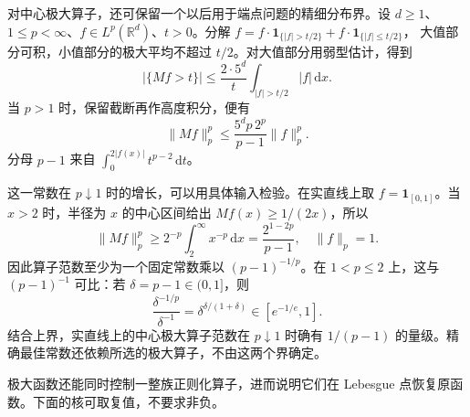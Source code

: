 对中心极大算子，还可保留一个以后用于端点问题的精细分布界。设 \(d\geq1\)、\(1\leq p<\infty\)、\(f\in L^p(\mathbb R^d)\)、\(t>0\)。分解
\(f=f\cdot\mathbf1_{\{|f|>t/2\}}+f\cdot\mathbf1_{\{|f|\leq t/2\}}\)，
大值部分可积，小值部分的极大平均不超过 \(t/2\)。对大值部分用弱型估计，得到
\begin{equation}\label{b2:eq:17-maximal-tail-refined}
 |\{Mf>t\}|\leq\frac{2\cdot5^d}{t}
                   \int_{|f|>t/2}|f|\,\mathrm dx.
\end{equation}
当 \(p>1\) 时，保留截断再作高度积分，便有
\[
 \|Mf\|_p^p\leq \frac{5^dp\,2^p}{p-1}\|f\|_p^p.
\]
分母 \(p-1\) 来自 \(\int_0^{2|f(x)|}t^{p-2}\,\mathrm dt\)。

\ProseParagraphBreak

这一常数在 \(p\downarrow1\) 时的增长，可以用具体输入检验。在实直线上取 \(f=\mathbf1_{[0,1]}\)。当 \(x>2\) 时，半径为 \(x\) 的中心区间给出 \(Mf(x)\geq1/(2x)\)，所以
\[
 \|Mf\|_p^p\geq2^{-p}\int_2^\infty x^{-p}\,\mathrm dx
 =\frac{2^{1-2p}}{p-1},
 \quad \|f\|_p=1.
\]
因此算子范数至少为一个固定常数乘以 \((p-1)^{-1/p}\)。在 \(1<p\leq2\) 上，这与 \((p-1)^{-1}\) 可比：若 \(\delta=p-1\in(0,1]\)，则
\[
 \frac{\delta^{-1/p}}{\delta^{-1}}
 =\delta^{\delta/(1+\delta)}\in[e^{-1/e},1].
\]
结合上界，实直线上的中心极大算子范数在 \(p\downarrow1\) 时确有 \(1/(p-1)\) 的量级。精确最佳常数还依赖所选的极大算子，不由这两个界确定。

\ProseParagraphBreak

极大函数还能同时控制一整族正则化算子，进而说明它们在 Lebesgue 点恢复原函数。下面的核可取复值，不要求非负。

